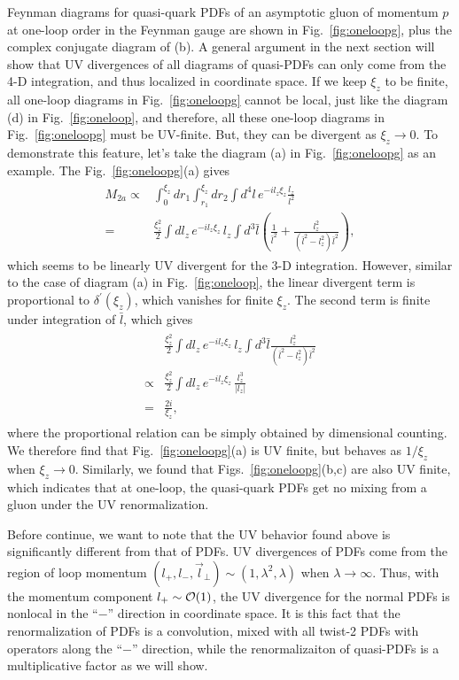 Feynman diagrams for quasi-quark PDFs of an asymptotic gluon of momentum $p$ at one-loop order in the Feynman gauge are shown in Fig.~\ref{fig:oneloopg}, plus the complex conjugate diagram of (b). A general argument in the next section will show that UV divergences of all diagrams of quasi-PDFs can only come from the 4-D integration, and thus localized in coordinate space. If we keep $\xi_z$ to be finite, all one-loop diagrams in Fig.~\ref{fig:oneloopg} cannot be local, just like the diagram (d) in Fig.~\ref{fig:oneloop}, and therefore, all these one-loop diagrams in Fig.~\ref{fig:oneloopg} must be UV-finite.  But, they can be divergent as $\xi_z\to 0$. To demonstrate this feature, let's take the diagram (a) in Fig.~\ref{fig:oneloopg} as an example. The Fig.~\ref{fig:oneloopg}(a) gives
\begin{align}
\begin{split}\label{eq:2a0}
M_{2a}\propto& \int_0^{\xi_z} dr_1 \int_{r_1}^{\xi_z} dr_2 \int d^4l\, e^{-il_z \xi_z} \frac{l_z}{l^2} \\
=&\frac{\xi_z^2}{2}\int dl_z \, e^{-il_z \xi_z} \, l_z \int d^{3}\bar{l} \left( \frac{1}{\bar{l}^2}+ \frac{l_z^2}{(\bar{l}^2-l_z^2)\bar{l}^2}\right),
\end{split}
\end{align}
which seems to be linearly UV divergent for the 3-D integration. However, similar to the case of diagram (a) in Fig.~\ref{fig:oneloop}, the linear divergent term is proportional to $\delta^\prime(\xi_z)$, which vanishes for finite $\xi_z$. The second term is finite under integration of $\bar{l}$, which gives
\begin{align}
\begin{split}\label{eq:2a}
& \frac{\xi_z^2}{2}\int dl_z \, e^{-il_z \xi_z} \, l_z \int d^{3}\bar{l} \frac{l_z^2}{(\bar{l}^2-l_z^2)\bar{l}^2}\\
\propto&\frac{\xi_z^2}{2}\int dl_z \, e^{-il_z \xi_z} \, \frac{l_z^3}{|l_z|}\\
=&\frac{2i}{\xi_z},
\end{split}
\end{align}
where the proportional relation can be simply obtained by dimensional counting. We therefore find that Fig.~\ref{fig:oneloopg}(a) is UV finite, but behaves as $1/\xi_z$ when $\xi_z \to 0$. Similarly, we found that Figs.~\ref{fig:oneloopg}(b,c) are also UV finite, which indicates that at one-loop, the quasi-quark PDFs get no mixing from a gluon under the UV renormalization.


Before continue, we want to note that the UV behavior found above is significantly different from that of PDFs.  UV divergences of PDFs come from the region of loop momentum $(l_+, l_-, \vec{l}_\perp)\sim(1,\lambda^2,\lambda)$ when $\lambda\to\infty$. Thus, with the momentum component $l_+\sim {\cal O}(1)$, the UV divergence for the normal PDFs is nonlocal in the ``$-$'' direction in coordinate space. It is this fact that the renormalization of PDFs is a convolution, mixed with all twist-2 PDFs with operators along the ``$-$'' direction, while the renormalizaiton of quasi-PDFs is a multiplicative factor as we will show.

